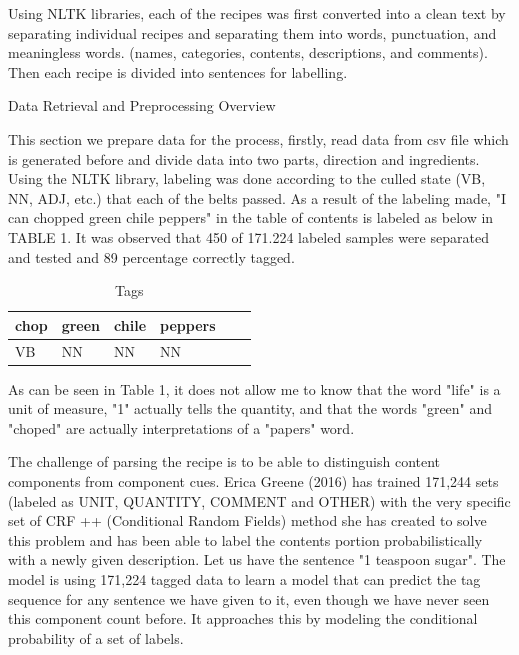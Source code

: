 Using NLTK libraries, each of the recipes was first converted into a clean text by separating individual recipes and separating them into words, punctuation, and meaningless words.  (names, categories, contents, descriptions, and comments). Then each recipe is divided into sentences for labelling.

\begin{algorithm}
\caption{Data Retrieval and Preprocessing Overview}
\label{alg:generator}

\end{algorithm}

This section we prepare data for the process, firstly, read data from csv file which is generated before and divide data into two parts, direction and ingredients. Using the NLTK library, labeling was done according to the culled state (VB, NN, ADJ, etc.) that each of the belts passed. As a result of the labeling made, "I can chopped green chile peppers" in the table of contents is labeled as below in TABLE 1. It was observed that 450 of 171.224 labeled samples were separated and tested and 89 percentage correctly tagged.

\begin{table}[]
\centering
\caption{Tags}
\label{my-label}
\begin{tabular}{|l|l|l|l|l|l|}
\hline
 chop & green & chile & peppers \\ \hline
 VB      & NN    & NN    & NN      \\ \hline
\end{tabular}
\end{table}

As can be seen in Table 1, it does not allow me to know that the word "life" is a unit of measure, "1" actually tells the quantity, and that the words "green" and "choped" are actually interpretations of a "papers" word.

The challenge of parsing the recipe is to be able to distinguish content components from component cues. Erica Greene (2016) has trained 171,244 sets (labeled as UNIT, QUANTITY, COMMENT and OTHER) with the very specific set of CRF ++ (Conditional Random Fields) method she has created to solve this problem and has been able to label the contents portion probabilistically with a newly given description. Let us have the sentence "1 teaspoon sugar". The model is using 171,224 tagged data to learn a model that can predict the tag sequence for any sentence we have given to it, even though we have never seen this component count before. It approaches this by modeling the conditional probability of a set of labels.

